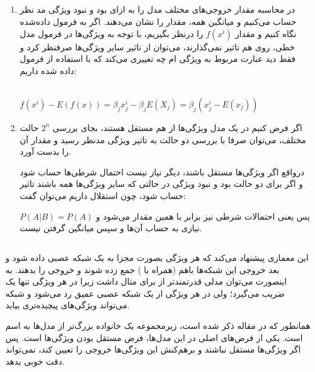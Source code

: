 \subsection{}
\begin{enumerate}
\item 
در محاسبه مقدار 
خروجی‌های مختلف مدل را به ازای بود و نبود ویژگی مد نظر حساب می‌کنیم و میانگین همه، مقدار
را نشان می‌دهند. اگر به فرمول داده‌شده نگاه کنیم و مقدار 
$f(x^i)$
را درنظر بگیریم، با توجه به ویژگی‌ها در فرمول مدل خطی، روی هم تاثیر نمی‌گذارند، می‌توان از تاثیر سایر ویژگی‌ها صرفنظر کرد و فقط دید عبارت مربوط به ویژگی 
ام چه تغییری می‌کند که با استفاده از فرمول داده شده داریم:
\begin{latin}
	~\\
	$
	f(x^i) - E(f(x)) = \beta_j x^i_j - \beta_j E(X_j) = \beta_j (x^i_j - E(x_j)) 
	$
\end{latin}
\item 
اگر فرض کنیم در یک مدل ویژگی‌ها از هم مستقل هستند، بجای بررسی 
$2^n$
حالت مختلف، می‌توان صرفا با بررسی دو حالت به تاثیر ویژگی مدنظر رسید و مقدار 
آن را بدست آورد. 

درواقع اگر ویژگی‌ها مستقل باشند، دیگر نیاز نیست احتمال شرطی‌ها حساب شود و اگر برای دو حالت بود و نبود ویژگی در حالتی که سایر ویژگی‌ها همه باشند تاثیر حساب شود، چون استقلال داریم می‌توان گفت:

$
P(A | B) = P(A)
$
پس یعنی احتمالات شرطی نیز برابر با همین مقدار می‌شود و نیازی به حساب آن‌ها و سپس میانگین گرفتن نیست.
\end{enumerate}


\subsection{}
این معماری پیشنهاد می‌کند که هر ویژگی بصورت مجزا به یک شبکه عصبی داده شود و بعد خروجی این شبکه‌ها باهم (همراه با 
)
 جمع زده شوند و خروجی را بدهند.  به اینصورت می‌توان مدلی قدرتمند‌تر از برای مثال
 داشت زیرا در 
 هر ویژگی تنها یک ضریب می‌گیرد؛ ولی در 
 هر ویژگی از یک شبکه عصبی عمیق رد می‌شود و شبکه می‌تواند ویژگی‌های پیچیده‌تری بیابد. 
 
 همانطور که در مقاله ذکر شده است،‌
 زیرمجموعه یک خانواده بزرگ‌تر از مدل‌ها به اسم 
 است. یکی از فرض‌های اصلی در این مدل‌ها، فرض مستقل بودن ویژگی‌ها است. پس اگر ویژگی‌ها مستقل نباشند و برهم‌کنش این ویژگی‌ها خروجی را تعیین کند، 
 نمی‌تواند دقت خوبی بدهد. 
 
